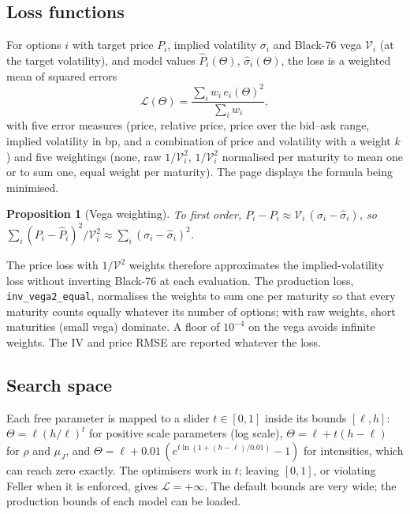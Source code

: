 \documentclass[11pt,a4paper]{article}
\newtheorem{proposition}{Proposition}
\theoremstyle{definition}
\theoremstyle{remark}
\begin{document}
\subsection{Loss functions}
For options $i$ with target price $P_i$, implied volatility $\sigma_i$ and Black-76 vega $\mathcal V_i$ (at the target volatility),
and model values $\hat P_i(\Theta)$, $\hat\sigma_i(\Theta)$, the loss is a weighted mean of squared errors
\begin{equation}
  \mathcal L(\Theta)=\frac{\sum_iw_i\,e_i(\Theta)^2}{\sum_iw_i},
\end{equation}
with five error measures (price, relative price, price over the bid--ask range, implied volatility in bp, and a combination of
price and volatility with a weight $k$) and five weightings (none, raw $1/\mathcal V_i^2$, $1/\mathcal V_i^2$ normalised per
maturity to mean one or to sum one, equal weight per maturity). The page displays the formula being minimised.
\begin{proposition}[Vega weighting]
To first order, $P_i-\hat P_i\approx\mathcal V_i\,(\sigma_i-\hat\sigma_i)$, so $\sum_i(P_i-\hat P_i)^2/\mathcal V_i^2\approx\sum_i(\sigma_i-\hat\sigma_i)^2$.
\end{proposition}
The price loss with $1/\mathcal V^2$ weights therefore approximates the implied-volatility loss without inverting Black-76 at each
evaluation. The production loss, \texttt{inv\_vega2\_equal}, normalises the weights to sum one per maturity so that every
maturity counts equally whatever its number of options; with raw weights, short maturities (small vega) dominate. A floor of
$10^{-4}$ on the vega avoids infinite weights. The IV and price RMSE are reported whatever the loss.

\subsection{Search space}
Each free parameter is mapped to a slider $t\in[0,1]$ inside its bounds $[\ell,h]$: $\Theta=\ell(h/\ell)^t$ for positive scale
parameters (log scale), $\Theta=\ell+t(h-\ell)$ for $\rho$ and $\mu_J$, and $\Theta=\ell+0.01\,(e^{t\ln(1+(h-\ell)/0.01)}-1)$ for
intensities, which can reach zero exactly. The optimisers work in $t$; leaving $[0,1]$, or violating Feller when it is enforced,
gives $\mathcal L=+\infty$. The default bounds are very wide; the production bounds of each model can be loaded.
\end{document}
